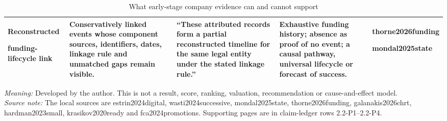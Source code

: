 \begin{table}[p]
\begin{tabularx}{\textwidth}{@{}P{0.152\textwidth}P{0.188\textwidth}P{0.22\textwidth}Y>{\RaggedRight\arraybackslash\scriptsize}p{0.15\textwidth}@{}}
    \addlinespace
    \textbf{Reconstructed}\par\textbf{funding-lifecycle link} &
    Conservatively linked events whose component sources, identifiers, dates, linkage rule and unmatched gaps remain visible. &
    ``These attributed records form a partial reconstructed timeline for the same legal entity under the stated linkage rule.'' &
    Exhaustive funding history; absence as proof of no event; a causal pathway, universal lifecycle or forecast of success. &
    thorne2026\allowbreak funding\par mondal2025\allowbreak state \\
    \bottomrule
  \end{tabularx}

  \caption{What early-stage company evidence can and cannot support}
  \label{tab:signal-inference-boundary}
  \vspace{3pt}

  \parbox{\textwidth}{\scriptsize
    \textit{Meaning:} Developed by the author. This is not a result, score, ranking, valuation, recommendation or cause-and-effect model.\\
    \textit{Source note:} The local sources are estrin2024digital, wasti2024successive, mondal2025state, thorne2026funding, galanakis2026chrt, hardman2023small, krasikov2020ready and fca2024promotions. Supporting pages are in claim-ledger rows 2.2-P1--2.2-P4.
  }
\end{table}
\clearpage
